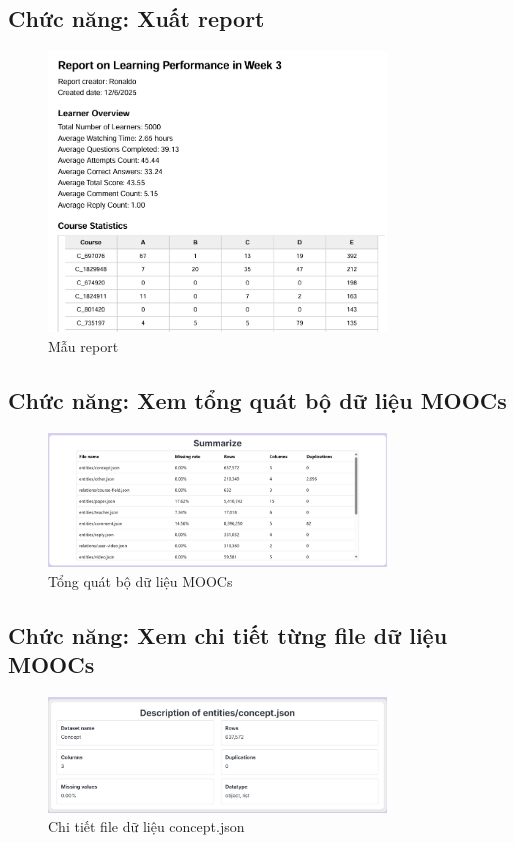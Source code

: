 \subsection{Chức năng: Xuất report}
\begin{figure}[H]
    \centering
    \includegraphics[width = 0.8\textwidth]{imgs/demo-5.png}
    \caption{Mẫu report}
    \label{fig:demo-5}
\end{figure}
\subsection{Chức năng: Xem tổng quát bộ dữ liệu MOOCs}
\begin{figure}[H]
    \centering
    \includegraphics[width = 0.8\textwidth]{imgs/demo-7.png}
    \caption{Tổng quát bộ dữ liệu MOOCs}
    \label{fig:demo-7}
\end{figure}
\subsection{Chức năng: Xem chi tiết từng file dữ liệu MOOCs}
\begin{figure}[H]
    \centering
    \includegraphics[width = 0.8\textwidth]{imgs/demo-8.png}
    \caption{Chi tiết file dữ liệu concept.json}
    \label{fig:demo-8}
\end{figure}

